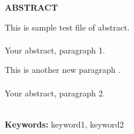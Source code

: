 \begin{center}
\thispagestyle{empty}
\vspace{2cm}
\LARGE{\textbf{ABSTRACT}}\\[1.0cm]
\end{center}
\thispagestyle{empty}
This is sample test file of abstract.
\large{\paragraph{}Your abstract, paragraph 1.}
This is another new paragraph .
\large{\paragraph{}Your abstract, paragraph 2.}\\
\textbf{Keywords: }keyword1, keyword2
